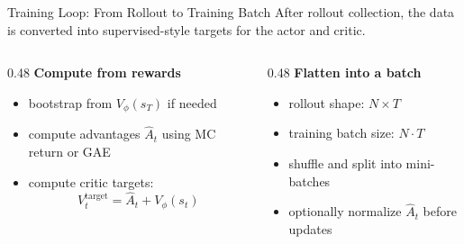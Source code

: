 \documentclass[aspectratio=169, 11pt]{beamer}
\begin{document}
\begin{frame}{Training Loop: From Rollout to Training Batch}
  After rollout collection, the data is converted into supervised-style targets
  for the actor and critic.

  \vspace{0.5em}
  \begin{columns}[T]
    \begin{column}{0.48\textwidth}
      \textbf{Compute from rewards}\\[0.2em]
      \begin{itemize}
        \item bootstrap from $V_\phi(s_T)$ if needed
        \item compute advantages $\hat{A}_t$ \newline using MC return or GAE
        \item compute critic targets:
          \[
            V_t^{\mathrm{target}}=\hat{A}_t+V_\phi(s_t)
          \]
      \end{itemize}
    \end{column}
    \begin{column}{0.48\textwidth}
      \textbf{Flatten into a batch}\\[0.2em]
      \begin{itemize}
        \item rollout shape: $N\times T$
        \item training batch size: $N\cdot T$
        \item shuffle and split into mini-batches
        \item optionally normalize $\hat{A}_t$ before updates
      \end{itemize}
    \end{column}
  \end{columns}
\end{frame}
\end{document}
